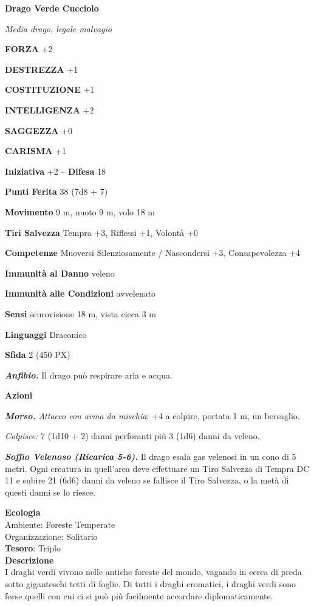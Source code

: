 \begin{multicols}{2}
\medskip{}\textbf{Drago Verde Cucciolo}

\textit{Media drago, legale malvagio}

\textbf{FORZA} +2

\textbf{DESTREZZA} +1

\textbf{COSTITUZIONE} +1

\textbf{INTELLIGENZA} +2

\textbf{SAGGEZZA} +0

\textbf{CARISMA} +1

\textbf{Iniziativa} +2 -- \textbf{Difesa} 18

\textbf{Punti Ferita} 38 (7d8 + 7)

\textbf{Movimento} 9 m, nuoto 9 m, volo 18 m

\textbf{Tiri Salvezza} Tempra +3, Riflessi +1, Volontà +0

\textbf{Competenze} Muoversi Silenziosamente / Nascondersi +3, Consapevolezza +4

\textbf{Immunità al Danno} veleno

\textbf{Immunità alle Condizioni} avvelenato

\textbf{Sensi} scurovisione 18 m, vista cieca 3 m

\textbf{Linguaggi} Draconico

\textbf{Sfida} 2 (450 PX)

\textit{\textbf{Anfibio.}} Il drago può respirare aria e acqua.

\textbf{Azioni}

\textit{\textbf{Morso.} Attacco con arma da mischia}: +4 a colpire, portata 1 m, un bersaglio.

\textit{Colpisce:} 7 (1d10 + 2) danni perforanti più 3 (1d6) danni da veleno.

\textit{\textbf{Soffio Velenoso (Ricarica 5-6).}} Il drago esala gas velenosi in un cono di 5 metri. Ogni creatura in quell'area deve effettuare un Tiro Salvezza di Tempra DC 11 e subire 21 (6d6) danni da veleno se fallisce il Tiro Salvezza, o la metà di questi danni se lo riesce.

\textbf{Ecologia}\\
Ambiente: Foreste Temperate\\
Organizzazione: Solitario\\
\textbf{Tesoro}: Triplo\\
\textbf{Descrizione}\\
I draghi verdi vivono nelle antiche foreste del mondo, vagando in cerca di preda sotto giganteschi tetti di foglie. Di tutti i draghi cromatici, i draghi verdi sono forse quelli con cui ci si può più facilmente accordare diplomaticamente.



\end{multicols}
